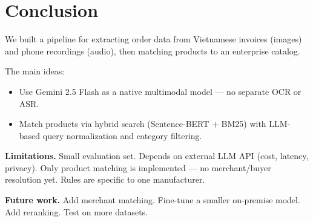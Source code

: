 \section{Conclusion}

We built a pipeline for extracting order data from Vietnamese invoices (images) and phone recordings (audio), then matching products to an enterprise catalog.

The main ideas:
\begin{itemize}
    \item Use Gemini 2.5 Flash as a native multimodal model — no separate OCR or ASR.
    \item Match products via hybrid search (Sentence-BERT + BM25) with LLM-based query normalization and category filtering.
\end{itemize}

\textbf{Limitations.} Small evaluation set. Depends on external LLM API (cost, latency, privacy). Only product matching is implemented — no merchant/buyer resolution yet. Rules are specific to one manufacturer.

\textbf{Future work.} Add merchant matching. Fine-tune a smaller on-premise model. Add reranking. Test on more datasets.
